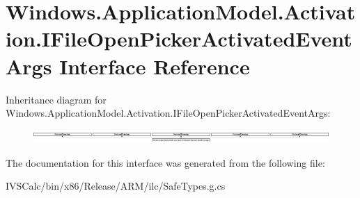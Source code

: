 \hypertarget{interface_windows_1_1_application_model_1_1_activation_1_1_i_file_open_picker_activated_event_args}{}\section{Windows.\+Application\+Model.\+Activation.\+I\+File\+Open\+Picker\+Activated\+Event\+Args Interface Reference}
\label{interface_windows_1_1_application_model_1_1_activation_1_1_i_file_open_picker_activated_event_args}
Inheritance diagram for Windows.\+Application\+Model.\+Activation.\+I\+File\+Open\+Picker\+Activated\+Event\+Args\+:\begin{figure}[H]
\begin{center}
\leavevmode
\includegraphics[height=0.510251cm]{interface_windows_1_1_application_model_1_1_activation_1_1_i_file_open_picker_activated_event_args}
\end{center}
\end{figure}


The documentation for this interface was generated from the following file\+:\begin{DoxyCompactItemize}
\item 
I\+V\+S\+Calc/bin/x86/\+Release/\+A\+R\+M/ilc/Safe\+Types.\+g.\+cs\end{DoxyCompactItemize}
